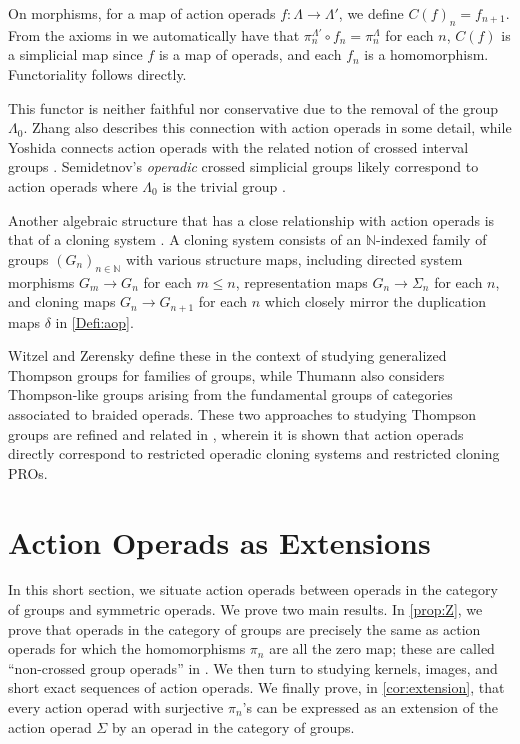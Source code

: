 \begin{rem}
On morphisms, for a map of action operads $f \colon \Lambda \rightarrow \Lambda'$, we define $C(f)_n = f_{n+1}$. From the axioms in  we automatically have that $\pi^{\Lambda'}_n \circ f_n = \pi^{\Lambda}_n$ for each $n$, $C(f)$ is a simplicial map since $f$ is a map of operads, and each $f_n$ is a homomorphism. Functoriality follows directly.

This functor is neither faithful nor conservative due to the removal of the group $\Lambda_0$. 
Zhang \cite[Section 2.4]{zhang-grp} also describes this connection with action operads in some detail, while Yoshida \cite{yoshida2018group} connects action operads with the related notion of crossed interval groups \cite{bm-crossed}. Semidetnov's \emph{operadic} crossed simplicial groups likely correspond to action operads where $\Lambda_0$ is the trivial group \cite[Definition 2.4]{semidetnov}.
\end{rem}

\begin{rem}\label{rem:cloning}
Another algebraic structure that has a close relationship with action operads is that of a cloning system \cite{zaremsky2017user}. A cloning system consists of an $\mathbb{N}$-indexed family of groups $(G_n)_{n \in \mathbb{N}}$ with various structure maps, including directed system morphisms $G_m \rightarrow G_n$ for each $m \leq n$, representation maps $G_n \rightarrow \Sigma_n$ for each $n$, and cloning maps $G_n \rightarrow G_{n+1}$ for each $n$ which closely mirror the duplication maps $\delta$ in \cref{Defi:aop}.

Witzel and Zerensky \cite{wz-cloning} define these in the context of studying generalized Thompson groups for families of groups, while Thumann \cite{thumann2017operad} also considers Thompson-like groups arising from the fundamental groups of categories associated to braided operads. These two approaches to studying Thompson groups are refined and related in \cite{accg-actionclones}, wherein it is shown that action operads directly correspond to restricted operadic cloning systems and restricted cloning PROs.
\end{rem}

\section{Action Operads as Extensions}\label{sec:extension}

In this short section, we situate action operads between operads in the category of groups and symmetric operads.
We prove two main results.
In \cref{prop:Z}, we prove that operads in the category of groups are precisely the same as action operads for which the homomorphisms $\pi_n$ are all the zero map; these are called ``non-crossed group operads'' in \cite{zhang-grp}.
We then turn to studying kernels, images, and short exact sequences of action operads.
We finally prove, in \cref{cor:extension}, that every action operad with surjective $\pi_n$'s can be expressed as an extension of the action operad $\Sigma$ by an operad in the category of groups.

